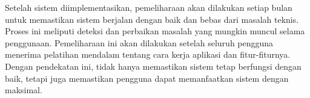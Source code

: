 Setelah sistem diimplementasikan, pemeliharaan akan dilakukan setiap bulan untuk memastikan sistem berjalan dengan baik dan bebas dari masalah teknis. Proses ini meliputi deteksi dan perbaikan masalah yang mungkin muncul selama penggunaan. Pemeliharaan ini akan dilakukan setelah seluruh pengguna menerima pelatihan mendalam tentang cara kerja aplikasi dan fitur-fiturnya. Dengan pendekatan ini, tidak hanya memastikan sistem tetap berfungsi dengan baik, tetapi juga memastikan pengguna dapat memanfaatkan sistem dengan maksimal.